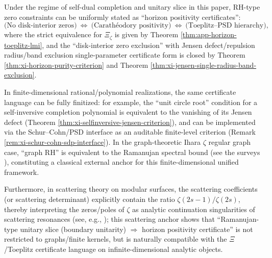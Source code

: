 \begin{proposition}\label{prop:xi-ramanujan-horizon-toeplitz-transfer}
Under the regime of self-dual completion and unitary slice in this paper, RH-type zero constraints can be uniformly stated as ``horizon positivity certificates'':
\[
\text{(No disk-interior zeros)}
\ \Longleftrightarrow\
\text{(Carath\'eodory positivity)}
\ \Longleftrightarrow\
\text{(Toeplitz--PSD hierarchy)},
\]
where the strict equivalence for \(\Xi_{\zeta}\) is given by Theorem \ref{thm:app-horizon-toeplitz-lmi}, and the ``disk-interior zero exclusion'' with Jensen defect/repulsion radius/band exclusion single-parameter certificate form is closed by Theorem \ref{thm:xi-horizon-purity-criterion} and Theorem \ref{thm:xi-jensen-single-radius-band-exclusion}.
\par
In finite-dimensional rational/polynomial realizations, the same certificate language can be fully finitized: for example, the ``unit circle root'' condition for a self-inversive completion polynomial is equivalent to the vanishing of its Jensen defect (Theorem \ref{thm:xi-selfinversive-jensen-criterion}), and can be implemented via the Schur--Cohn/PSD interface as an auditable finite-level criterion (Remark \ref{rem:xi-schur-cohn-sdp-interface}).
In the graph-theoretic Ihara \(\zeta\) regular graph case, ``graph RH'' is equivalent to the Ramanujan spectral bound (see the surveys \cite{TerrasZetaGraphs,StarkTerras1996GraphCoverings}), constituting a classical external anchor for this finite-dimensional unified framework.
\par
Furthermore, in scattering theory on modular surfaces, the scattering coefficients (or scattering determinant) explicitly contain the ratio \(\zeta(2s-1)/\zeta(2s)\), thereby interpreting the zeros/poles of \(\zeta\) as analytic continuation singularities of scattering resonances (see, e.g., \cite{Iwaniec2002SpectralMethods}); this scattering anchor shows that ``Ramanujan-type unitary slice (boundary unitarity) \(\Rightarrow\) horizon positivity certificate'' is not restricted to graphs/finite kernels, but is naturally compatible with the \(\Xi\)/Toeplitz certificate language on infinite-dimensional analytic objects.
\end{proposition}

